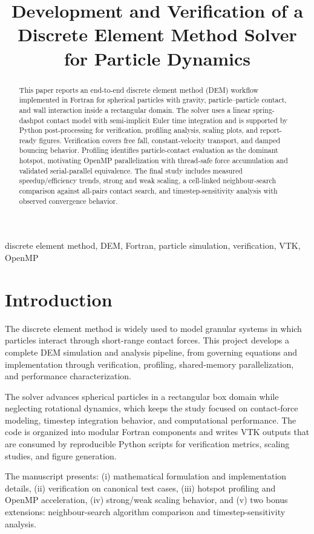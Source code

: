 \documentclass[conference]{IEEEtran}
\title{Development and Verification of a Discrete Element Method Solver for Particle Dynamics}
\author{
\IEEEauthorblockN{Pranjal Vats}
\IEEEauthorblockA{
SMME / Indian Institute of Technology , Mandi \\
}
}
\begin{document}
\maketitle

\begin{abstract}
This paper reports an end-to-end discrete element method (DEM) workflow implemented in Fortran for spherical particles with gravity, particle--particle contact, and wall interaction inside a rectangular domain. The solver uses a linear spring-dashpot contact model with semi-implicit Euler time integration and is supported by Python post-processing for verification, profiling analysis, scaling plots, and report-ready figures. Verification covers free fall, constant-velocity transport, and damped bouncing behavior. Profiling identifies particle-contact evaluation as the dominant hotspot, motivating OpenMP parallelization with thread-safe force accumulation and validated serial-parallel equivalence. The final study includes measured speedup/efficiency trends, strong and weak scaling, a cell-linked neighbour-search comparison against all-pairs contact search, and timestep-sensitivity analysis with observed convergence behavior.
\end{abstract}

\begin{IEEEkeywords}
discrete element method, DEM, Fortran, particle simulation, verification, VTK, OpenMP
\end{IEEEkeywords}

\section{Introduction}
The discrete element method is widely used to model granular systems in which particles interact through short-range contact forces. This project develops a complete DEM simulation and analysis pipeline, from governing equations and implementation through verification, profiling, shared-memory parallelization, and performance characterization.

The solver advances spherical particles in a rectangular box domain while neglecting rotational dynamics, which keeps the study focused on contact-force modeling, timestep integration behavior, and computational performance. The code is organized into modular Fortran components and writes VTK outputs that are consumed by reproducible Python scripts for verification metrics, scaling studies, and figure generation.

The manuscript presents: (i) mathematical formulation and implementation details, (ii) verification on canonical test cases, (iii) hotspot profiling and OpenMP acceleration, (iv) strong/weak scaling behavior, and (v) two bonus extensions: neighbour-search algorithm comparison and timestep-sensitivity analysis.
\end{document}
